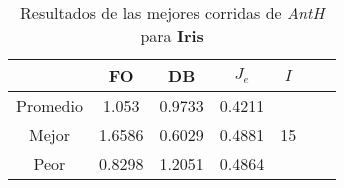 \begin{table}[h!]
\footnotesize
\begin{center}
\begin{tabular}{|c|c|c|c|c|c|c|}
\hline
& {\bf FO} & {\bf DB}& $J_e$ & $I$\\
\hline
\hline
Promedio   & 1.053 & 0.9733  & 0.4211  & \\
\cline{1-4}
Mejor & 1.6586 & 0.6029  & 0.4881 & 15\\
\cline{1-4}
Peor & 0.8298 & 1.2051  & 0.4864  & \\\hline
\end{tabular}
\caption{Resultados de las mejores corridas de \emph{AntH} para {\bf Iris}}
\label{tb:pmpanthibcsv}
\end{center}
\end{table}
